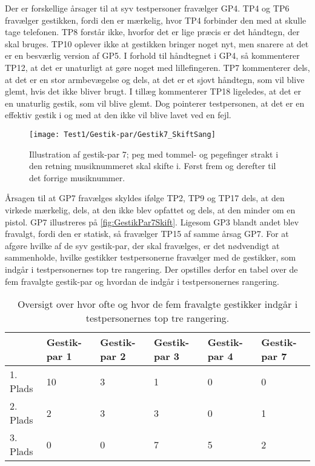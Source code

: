\noindent
%
Der er forskellige årsager til at syv testpersoner fravælger GP4. TP4 og TP6 fravælger gestikken, fordi den er mærkelig, hvor TP4 forbinder den med at skulle tage telefonen. TP8 forstår ikke, hvorfor det er lige præcis er det håndtegn, der skal bruges. TP10 oplever ikke at gestikken bringer noget nyt, men snarere at det er en besværlig version af GP5. I forhold til håndtegnet i GP4, så kommenterer TP12, at det er unaturligt at gøre noget med lillefingeren. TP7 kommenterer dels, at det er en stor armbevægelse og dels, at det er et sjovt håndtegn, som vil blive glemt, hvis det ikke bliver brugt. I tillæg kommenterer TP18 ligeledes, at det er en unaturlig gestik, som vil blive glemt. Dog pointerer testpersonen, at det er en effektiv gestik i og med at den ikke vil blive lavet ved en fejl.
%
\begin{figure}[H]
	\centering
	\texttt{[image: Test1/Gestik-par/Gestik7\_SkiftSang]}
	\caption{Illustration af gestik-par 7; peg med tommel- og pegefinger strakt i den retning musiknummeret skal skifte i. Først frem og derefter til det forrige musiknummer.}
	\label{fig:GestikPar7Skift}
\end{figure}
\noindent
% 
Årsagen til at GP7 fravælges skyldes ifølge TP2, TP9 og TP17 dels, at den virkede mærkelig, dels, at den ikke blev opfattet og dels, at den minder om en pistol. GP7 illustreres på \autoref{fig:GestikPar7Skift}. Ligesom GP3 blandt andet blev fravalgt, fordi den er statisk, så fravælger TP15 af samme årsag GP7.\blankline
%
For at afgøre hvilke af de syv gestik-par, der skal fravælges, er det nødvendigt at sammenholde, hvilke gestikker testpersonerne fravælger med de gestikker, som indgår i testpersonernes top tre rangering. Der opstilles derfor en tabel over de fem fravalgte gestik-par og hvordan de indgår i testpersonernes rangering.    
%
\begin{table}[H]
	\centering
	\begin{tabular}{ | p{1.5cm} | p{2.1cm} | p{2.1cm} | p{2.1cm} | p{2.1cm} | p{2.1cm} |}
	\hline
		 & Gestik-par 1 & Gestik-par 2 & Gestik-par 3 & Gestik-par 4 & Gestik-par 7 \\ \hline
		1. Plads & 10 & 3 & 1 & 0 & 0\\ \hline
		2. Plads & 2 & 3 & 3 & 0 & 1\\ \hline
		3. Plads & 0 & 0 & 7 & 5 & 2\\ \hline
	\end{tabular}
	\caption{Oversigt over hvor ofte og hvor de fem fravalgte gestikker indgår i testpersonernes top tre rangering.}
	\label{tab:FravalgteTopTreSkift}
\end{table}
